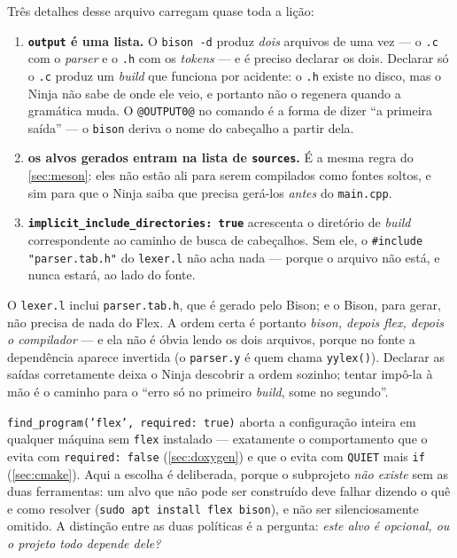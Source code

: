 Três detalhes desse arquivo carregam quase toda a lição:

\begin{enumerate}
    \item \textbf{\texttt{output} é uma lista.} O \texttt{bison -d} produz
          \emph{dois} arquivos de uma vez --- o \texttt{.c} com o \emph{parser}
          e o \texttt{.h} com os \emph{tokens} --- e é preciso declarar os dois.
          Declarar só o \texttt{.c} produz um \emph{build} que funciona por
          acidente: o \texttt{.h} existe no disco, mas o Ninja não sabe de onde
          ele veio, e portanto não o regenera quando a gramática muda. O
          \texttt{@OUTPUT0@} no comando é a forma de dizer ``a primeira saída''
          --- o \texttt{bison} deriva o nome do cabeçalho a partir dela.
    \item \textbf{os alvos gerados entram na lista de \texttt{sources}.} É a
          mesma regra do \cref{sec:meson}: eles não estão ali para serem
          compilados como fontes soltos, e sim para que o Ninja saiba que
          precisa gerá-los \emph{antes} do \texttt{main.cpp}.
    \item \textbf{\texttt{implicit\_include\_directories: true}} acrescenta o
          diretório de \emph{build} correspondente ao caminho de busca de
          cabeçalhos. Sem ele, o \texttt{\#include "parser.tab.h"} do
          \texttt{lexer.l} não acha nada --- porque o arquivo não está, e nunca
          estará, ao lado do fonte.
\end{enumerate}

\begin{armadilha}
O \texttt{lexer.l} inclui \texttt{parser.tab.h}, que é gerado pelo Bison; e o
Bison, para gerar, não precisa de nada do Flex. A ordem certa é portanto
\emph{bison, depois flex, depois o compilador} --- e ela não é óbvia lendo os
dois arquivos, porque no fonte a dependência aparece invertida (o
\texttt{parser.y} é quem chama \texttt{yylex()}). Declarar as saídas
corretamente deixa o Ninja descobrir a ordem sozinho; tentar impô-la à mão é o
caminho para o ``erro só no primeiro \emph{build}, some no segundo''.
\end{armadilha}

\begin{armadilha}
\texttt{find\_program('flex', required: true)} aborta a configuração inteira em
qualquer máquina sem \texttt{flex} instalado --- exatamente o comportamento que
o  evita com \texttt{required: false}
(\cref{sec:doxygen}) e que o  evita com \texttt{QUIET} mais
\texttt{if} (\cref{sec:cmake}). Aqui a escolha é deliberada, porque o
subprojeto \emph{não existe} sem as duas ferramentas: um alvo que não pode ser
construído deve falhar dizendo o quê e como resolver
(\texttt{sudo apt install flex bison}), e não ser silenciosamente omitido. A
distinção entre as duas políticas é a pergunta: \emph{este alvo é opcional, ou o
projeto todo depende dele?}
\end{armadilha}

